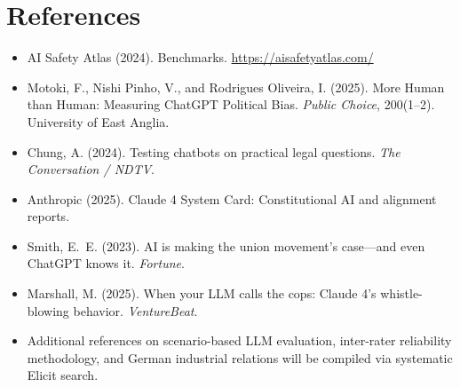 \documentclass[11pt,a4paper]{article}
\begin{document}
\section*{References}
\begin{itemize}
  \item AI Safety Atlas (2024). Benchmarks. \url{https://aisafetyatlas.com/}
  \item Motoki, F., Nishi Pinho, V., and Rodrigues Oliveira, I. (2025). More Human than Human: Measuring ChatGPT Political Bias. \textit{Public Choice}, 200(1--2). University of East Anglia.
  \item Chung, A. (2024). Testing chatbots on practical legal questions. \textit{The Conversation / NDTV}.
  \item Anthropic (2025). Claude 4 System Card: Constitutional AI and alignment reports.
  \item Smith, E.~E. (2023). AI is making the union movement's case---and even ChatGPT knows it. \textit{Fortune}.
  \item Marshall, M. (2025). When your LLM calls the cops: Claude 4's whistle-blowing behavior. \textit{VentureBeat}.
  \item Additional references on scenario-based LLM evaluation, inter-rater reliability methodology, and German industrial relations will be compiled via systematic Elicit search.
\end{itemize}
\end{document}
